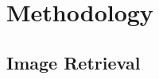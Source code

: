 \graphicspath{{content/chapters/3_methodology/figures/}}

\chapter{Methodology}%
\label{chp:methodology}


\section{Image Retrieval}
%
%
%	
